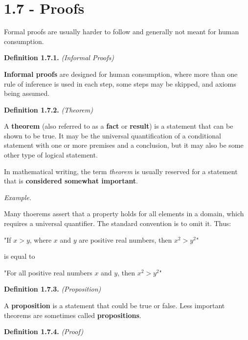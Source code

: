 \documentclass[12pt, letterpaper]{article}
\begin{document}
\section*{1.7 - Proofs}

Formal proofs are usually harder to follow and generally not meant for human consumption.

\textbf{Definition 1.7.1.} \textit{(Informal Proofs)}
\medskip

\textbf{Informal proofs} are designed for human consumption, where more than one rule of inference is used in each step, some steps may be skipped, and axioms being assumed.

\bigskip
\bigskip

\textbf{Definition 1.7.2.} \textit{(Theorem)}
\medskip

A \textbf{theorem} (also referred to as a \textbf{fact} or \textbf{result}) is a statement that can be shown to be true. It may be the universal quantification of a conditional statement with one or more premises and a conclusion, but it may also be some other type of logical statement.
\medskip

In mathematical writing, the term \textit{theorem} is usually reserved for a statement that is \textbf{considered somewhat important}.
\bigskip

\textit{Example.}
\medskip

Many thoerems assert that a property holds for all elements in a domain, which requires a universal quantifier. The standard convention is to omit it. Thus:

\medskip
{\centering

"If $ x > y $, where $ x $ and $ y $ are positive real numbers, then $ x^2 > y^2 $"

}
\medskip

is equal to

\medskip
{\centering

"For all positive real numbers $ x $ and $ y $, then $ x^2 > y^2 $"

}
\medskip

\bigskip
\bigskip

\textbf{Definition 1.7.3.} \textit{(Proposition)}
\medskip

A \textbf{proposition} is a statement that could be true or false. Less important theorems are sometimes called \textbf{propositions}.

\bigskip
\bigskip

\textbf{Definition 1.7.4.} \textit{(Proof)}
\medskip
\end{document}
